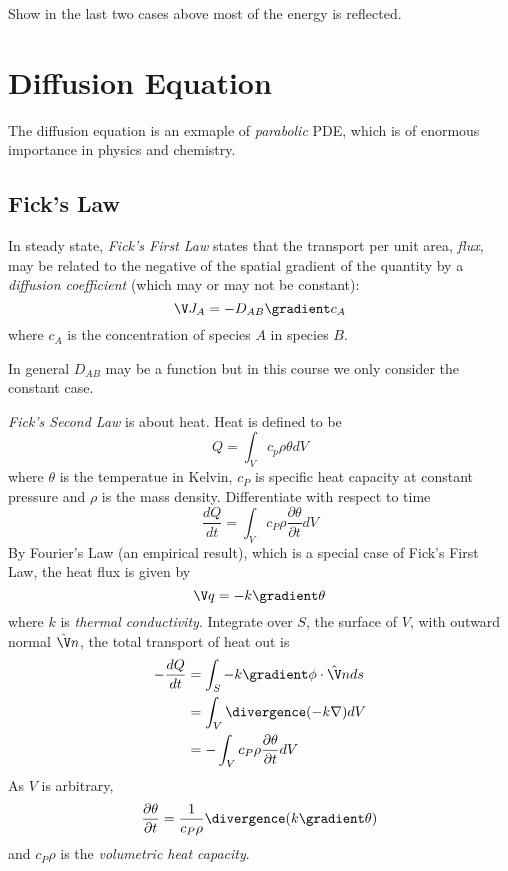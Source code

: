 \documentclass[a4paper]{article}
\newcommand*\grad{\gradient}
\newcommand*\dive{\divergence}
\begin{document}
\begin{ex}
  Show in the last two cases above most of the energy is reflected.
\end{ex}

\section{Diffusion Equation}

The diffusion equation is an exmaple of \emph{parabolic} PDE, which is of enormous importance in physics and chemistry.

\subsection{Fick's Law}

In steady state, \emph{Fick's First Law} states that the transport per unit area, \emph{flux}, may be related to the negative of the spatial gradient of the quantity by a \emph{diffusion coefficient} (which may or may not be constant):
\[
  \V J_A = -D_{AB} \grad c_A
\]
where \(c_A\) is the concentration of species \(A\) in species \(B\).

In general \(D_{AB}\) may be a function but in this course we only consider the constant case.

\emph{Fick's Second Law} is about heat. Heat is defined to be
\[
  Q = \int_{V}^{ } c_p \rho \theta dV
\]
where \(\theta\) is the temperatue in Kelvin, \(c_P\) is specific heat capacity at constant pressure and \(\rho\) is the mass density. Differentiate with respect to time
\[
  \frac{dQ}{dt} = \int_{V}^{ } c_P \rho \frac{\partial \theta}{\partial t} dV
\]
By Fourier's Law (an empirical result), which is a special case of Fick's First Law, the heat flux is given by
\[
  \V q = -k \grad \theta
\]
where \(k\) is \emph{thermal conductivity}. Integrate over \(S\), the surface of \(V\), with outward normal \(\hat \V n\), the total transport of heat out is
\begin{align*}
  -\frac{dQ}{dt} &= \int_{S}^{ } -k\grad \phi \cdot \hat \V n ds \\
                 &= \int_{V}^{ } \dive (-k \nabla) dV \\
                 &= -\int_{V}^{ } c_P \rho \frac{\partial \theta}{\partial t} dV
\end{align*}
As \(V\) is arbitrary,
\[
  \frac{\partial \theta}{\partial t} = \frac{1}{c_P \rho} \dive (k \grad \theta)
\]
and \(c_P\rho\) is the \emph{volumetric heat capacity}.
\end{document}
